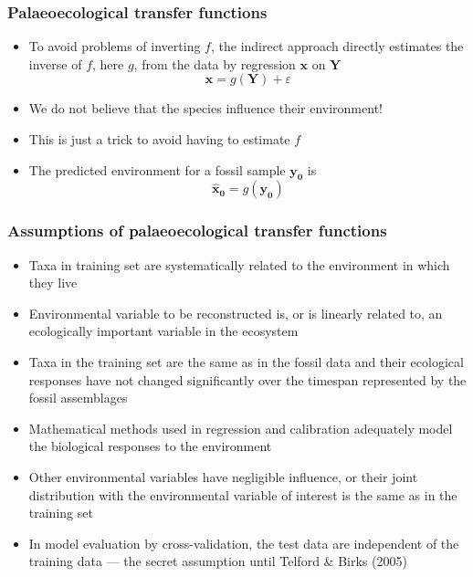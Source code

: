 \documentclass{beamer}
\begin{document}
\begin{frame}
    \frametitle{Palaeoecological transfer functions}
    \begin{itemize}
        \item To avoid problems of inverting $f$, the \alert{indirect} approach directly estimates the inverse of $f$, here $g$, from the data by regression $\mathbf{x}$ on $\mathbf{Y}$
        $$\mathbf{x} = g(\mathbf{Y}) + \varepsilon$$
        \item We do \alert{not} believe that the species influence their environment!
        \item This is just a trick to avoid having to estimate $f$
        \item The predicted environment for a fossil sample $\mathbf{y_0}$ is
        $$\mathbf{\hat{x}_0} = g(\mathbf{y_0})$$
    \end{itemize}
\end{frame}

\begin{frame}
    \frametitle{Assumptions of palaeoecological transfer functions}
    \begin{itemize}
        \item Taxa in training set are systematically related to the environment in which they live
        \item Environmental variable to be reconstructed is, or is linearly related to, an ecologically important variable in the ecosystem
        \item Taxa in the training set are the same as in the fossil data and their ecological responses have not changed significantly over the timespan represented by the fossil assemblages
        \item Mathematical methods used in regression and calibration adequately model the biological responses to the environment
        \item Other environmental variables have negligible influence, or their joint distribution with the environmental variable of interest is the same as in the training set
        \item In model evaluation by cross-validation, the test data are independent of the training data --- the \alert{secret assumption} until Telford \& Birks (2005)
    \end{itemize}
\end{frame}
\end{document}
